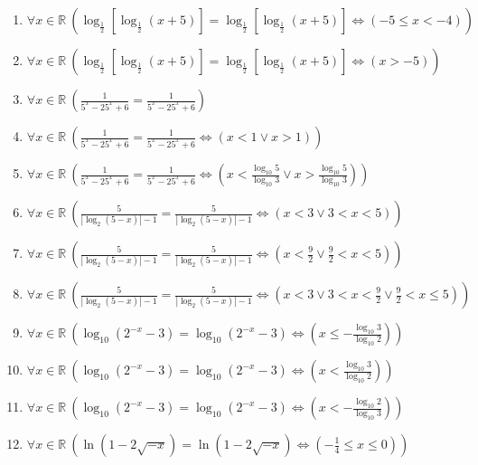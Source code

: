 \documentclass[11pt,a4paper]{article}
\begin{document}
\begin{enumerate}
\item $\displaystyle \forall x \in \mathbb{R}\ \left( \log_{\frac{1}{2}}\left[\log_{\frac{1}{2}}(x + 5)\right] = \log_{\frac{1}{2}}\left[\log_{\frac{1}{2}}(x + 5)\right] \iff \left( -5 \le x < -4 \right) \right)$
\item $\displaystyle \forall x \in \mathbb{R}\ \left( \log_{\frac{1}{2}}\left[\log_{\frac{1}{2}}(x + 5)\right] = \log_{\frac{1}{2}}\left[\log_{\frac{1}{2}}(x + 5)\right] \iff \left( x > -5 \right) \right)$
\item $\displaystyle \forall x \in \mathbb{R}\ \left( \frac{1}{5^{x} - 25^{x} + 6} = \frac{1}{5^{x} - 25^{x} + 6} \right)$
\item $\displaystyle \forall x \in \mathbb{R}\ \left( \frac{1}{5^{x} - 25^{x} + 6} = \frac{1}{5^{x} - 25^{x} + 6} \iff \left( x < 1 \lor x > 1 \right) \right)$
\item $\displaystyle \forall x \in \mathbb{R}\ \left( \frac{1}{5^{x} - 25^{x} + 6} = \frac{1}{5^{x} - 25^{x} + 6} \iff \left( x < \frac{\log_{10} 5}{\log_{10} 3} \lor x > \frac{\log_{10} 5}{\log_{10} 3} \right) \right)$
\item $\displaystyle \forall x \in \mathbb{R}\ \left( \frac{5}{\left| \log_{2}(5 - x) \right| - 1} = \frac{5}{\left| \log_{2}(5 - x) \right| - 1} \iff \left( x < 3 \lor 3 < x < 5 \right) \right)$
\item $\displaystyle \forall x \in \mathbb{R}\ \left( \frac{5}{\left| \log_{2}(5 - x) \right| - 1} = \frac{5}{\left| \log_{2}(5 - x) \right| - 1} \iff \left( x < \frac{9}{2} \lor \frac{9}{2} < x < 5 \right) \right)$
\item $\displaystyle \forall x \in \mathbb{R}\ \left( \frac{5}{\left| \log_{2}(5 - x) \right| - 1} = \frac{5}{\left| \log_{2}(5 - x) \right| - 1} \iff \left( x < 3 \lor 3 < x < \frac{9}{2} \lor \frac{9}{2} < x \le 5 \right) \right)$
\item $\displaystyle \forall x \in \mathbb{R}\ \left( \log_{10}(2^{-x} - 3) = \log_{10}(2^{-x} - 3) \iff \left( x \le -\frac{\log_{10} 3}{\log_{10} 2} \right) \right)$
\item $\displaystyle \forall x \in \mathbb{R}\ \left( \log_{10}(2^{-x} - 3) = \log_{10}(2^{-x} - 3) \iff \left( x < \frac{\log_{10} 3}{\log_{10} 2} \right) \right)$
\item $\displaystyle \forall x \in \mathbb{R}\ \left( \log_{10}(2^{-x} - 3) = \log_{10}(2^{-x} - 3) \iff \left( x < -\frac{\log_{10} 2}{\log_{10} 3} \right) \right)$
\item $\displaystyle \forall x \in \mathbb{R}\ \left( \ln(1 - 2\sqrt{-x}) = \ln(1 - 2\sqrt{-x}) \iff \left( -\frac{1}{4} \le x \le 0 \right) \right)$

\end{enumerate}
\end{document}

